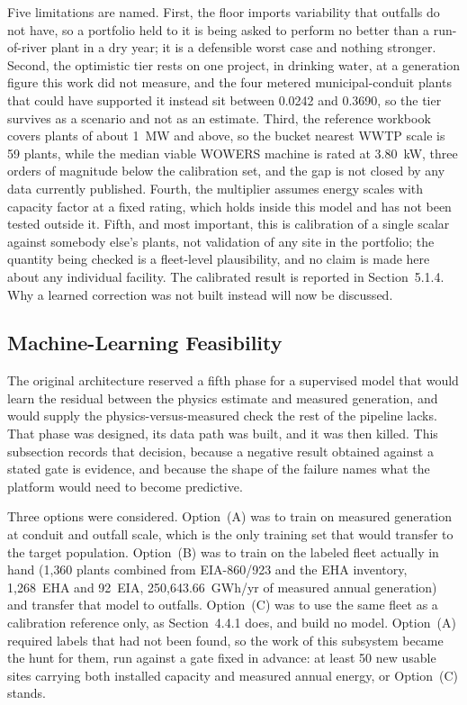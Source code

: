\documentclass[12pt,letterpaper]{report}
\begin{document}
Five limitations are named. First, the floor imports variability that outfalls do
not have, so a portfolio held to it is being asked to perform no better than a
run-of-river plant in a dry year; it is a defensible worst case and nothing
stronger. Second, the optimistic tier rests on one project, in drinking water, at a
generation figure this work did not measure, and the four metered municipal-conduit
plants that could have supported it instead sit between 0.0242 and 0.3690, so the
tier survives as a scenario and not as an estimate. Third, the reference workbook covers
plants of about 1~MW and above, so the bucket nearest WWTP scale is 59 plants,
while the median viable WOWERS machine is rated at 3.80~kW, three orders of
magnitude below the calibration set, and the gap is not closed by any data
currently published. Fourth, the multiplier assumes energy scales with capacity
factor at a fixed rating, which holds inside this model and has not been tested
outside it. Fifth, and most important, this is calibration of a single scalar
against somebody else's plants, not validation of any site in the portfolio; the
quantity being checked is a fleet-level plausibility, and no claim is made here
about any individual facility. The calibrated result is reported in
Section~5.1.4. Why a learned correction was not built instead will now be
discussed.

\subsection{Machine-Learning Feasibility}

The original architecture reserved a fifth phase for a supervised model that would
learn the residual between the physics estimate and measured generation, and would
supply the physics-versus-measured check the rest of the pipeline lacks. That
phase was designed, its data path was built, and it was then killed. This
subsection records that decision, because a negative result obtained against a
stated gate is evidence, and because the shape of the failure names what the
platform would need to become predictive.

Three options were considered. Option~(A) was to train on measured generation at
conduit and outfall scale, which is the only training set that would transfer to
the target population. Option~(B) was to train on the labeled fleet actually in
hand (1{,}360 plants combined from EIA-860/923 and the EHA inventory,
1{,}268~EHA and 92~EIA, 250{,}643.66~GWh/yr of measured annual generation) and
transfer that model to outfalls. Option~(C) was to use the same fleet as a
calibration reference only, as Section~4.4.1 does, and build no model. Option~(A)
required labels that had not been found, so the work of this subsystem became the
hunt for them, run against a gate fixed in advance: at least 50 new usable sites
carrying both installed capacity and measured annual energy, or Option~(C) stands.
\end{document}
